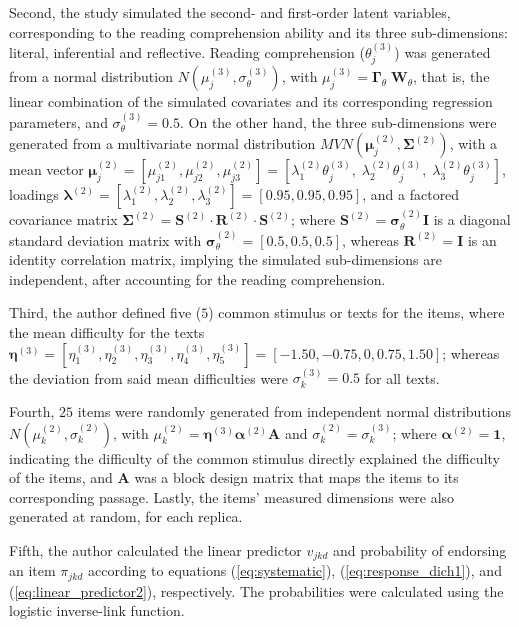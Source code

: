 Second, the study simulated the second- and first-order latent variables, corresponding to the reading comprehension ability and its three sub-dimensions: literal, inferential and reflective. Reading comprehension ($\theta^{(3)}_{j}$) was generated from a normal distribution $N( \mu^{(3)}_{j}, \sigma^{(3)}_{\theta} )$, with $\mu^{(3)}_{j} = \pmb{\Gamma}_{\theta} \; \mathbf{W}_{\theta}$, that is, the linear combination of the simulated covariates and its corresponding regression parameters, and $\sigma^{(3)}_{\theta}=0.5$. On the other hand, the three sub-dimensions were generated from a multivariate normal distribution $MVN( \pmb{\mu}^{(2)}_{j} , \pmb{\Sigma}^{(2)})$, with a mean vector $\pmb{\mu}^{(2)}_{j} = [\mu^{(2)}_{j1}, \mu^{(2)}_{j2}, \mu^{(2)}_{j3}] = [\lambda^{(2)}_{1} \theta^{(3)}_{j}, \; \lambda^{(2)}_{2} \theta^{(3)}_{j}, \; \lambda^{(2)}_{3} \theta^{(3)}_{j} ]$, loadings $\pmb{\lambda}^{(2)} = [\lambda^{(2)}_{1}, \lambda^{(2)}_{2}, \lambda^{(2)}_{3}] = [0.95, 0.95, 0.95]$, and a factored covariance matrix $\pmb{\Sigma}^{(2)} = \mathbf{S}^{(2)} \cdot \mathbf{R}^{(2)} \cdot \mathbf{S}^{(2)}$; where $\mathbf{S}^{(2)} = \pmb{\sigma}^{(2)}_{\theta} \mathbf{I}$ is a diagonal standard deviation matrix with $\pmb{\sigma}^{(2)}_{\theta} = [0.5, 0.5, 0.5]$, whereas $\mathbf{R}^{(2)} = \mathbf{I}$ is an identity correlation matrix, implying the simulated sub-dimensions are independent, after accounting for the reading comprehension.

Third, the author defined five ($5$) common stimulus or texts for the items, where the mean difficulty for the texts $\pmb{\eta}^{(3)} = [\eta^{(3)}_{1}, \eta^{(3)}_{2}, \eta^{(3)}_{3}, \eta^{(3)}_{4}, \eta^{(3)}_{5}] = [-1.50, -0.75, 0, 0.75, 1.50]$; whereas the deviation from said mean difficulties were $\sigma^{(3)}_{k} = 0.5$ for all texts. 

Fourth, $25$ items were randomly generated from independent normal distributions $N( \mu^{(2)}_{k}, \sigma^{(2)}_{k} ) $, with $\mu^{(2)}_{k} = \pmb{\eta}^{(3)} \pmb{\alpha}^{(2)} \mathbf{A}$ and $\sigma^{(2)}_{k} = \sigma^{(3)}_{k}$; where $\pmb{\alpha}^{(2)} = \mathbf{1}$, indicating the difficulty of the common stimulus directly explained the difficulty of the items, and $\mathbf{A}$ was a block design matrix that maps the items to its corresponding passage. Lastly, the items' measured dimensions were also generated at random, for each replica.

Fifth, the author calculated the linear predictor $v_{jkd}$ and probability of endorsing an item $\pi_{jkd}$ according to equations (\ref{eq:systematic}), (\ref{eq:response_dich1}), and (\ref{eq:linear_predictor2}), respectively. The probabilities were calculated using the logistic inverse-link function.
	
